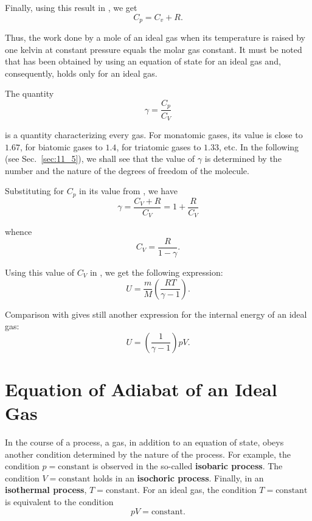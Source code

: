 \noindent
Finally, using this result in , we get
\begin{equation}\label{eq:10_33}
	C_p = C_v + R.
\end{equation}

Thus, the work done by a mole of an ideal gas when its temperature is raised by one kelvin at constant pressure equals the molar gas constant. It must be noted that  has been obtained by using an equation of state for an ideal gas and, consequently, holds only for an ideal gas.

The quantity
\begin{equation}\label{eq:10_34}
	\gamma = \frac{C_p}{C_V}
\end{equation}

\noindent
is a quantity characterizing every gas. For monatomic gases, its value is close to $1.67$, for biatomic gases to $1.4$, for triatomic gases to $1.33$, etc. In the following (see Sec.~\ref{sec:11_5}), we shall see that the value of $\gamma$ is determined by the number and the nature of the degrees of freedom of the molecule.

Substituting for $C_p$ in  its value from , we have
\begin{equation*}
	\gamma = \frac{C_V + R}{C_V} = 1 + \frac{R}{C_V}
\end{equation*}

\noindent
whence
\begin{equation}\label{eq:10_35}
	C_V = \frac{R}{1 - \gamma}.
\end{equation}

\noindent
Using this value of $C_V$ in , we get the following expression:
\begin{equation}\label{eq:10_36}
	U = \frac{m}{M}\left(\frac{RT}{\gamma - 1}\right).
\end{equation}

\noindent
Comparison with  gives still another expression for the internal energy of an ideal gas:
\begin{equation}\label{eq:10_37}
	U = \left(\frac{1}{\gamma - 1}\right) pV.
\end{equation}

\section{Equation of Adiabat of an Ideal Gas}\label{sec:10_10}

In the course of a process, a gas, in addition to an equation of state, obeys another condition determined by the nature of the process. For example, the condition $p=\text{constant}$ is observed in the so-called \textbf{isobaric process}. The condition $V=\text{constant}$ holds in an \textbf{isochoric process}. Finally, in an \textbf{isothermal process}, $T=\text{constant}$. For an ideal gas, the condition $T=\text{constant}$ is equivalent to the condition
\begin{equation}\label{eq:10_38}
	pV = \text{constant}.
\end{equation}

